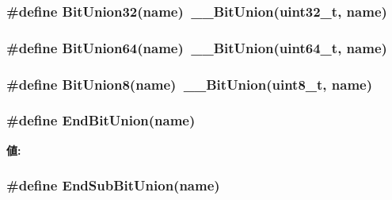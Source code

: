 \label{bitunion_8hh_ab20ad0bcf530a8c69acba93573493580}
\hypertarget{bitunion_8hh_a0ccde5c4cc801eb6422a3b9a11d4815f}{
\subsubsection[{BitUnion32}]{\setlength{\rightskip}{0pt plus 5cm}\#define BitUnion32(name)~\_\-\_\-BitUnion({\bf uint32\_\-t}, name)}}
\label{bitunion_8hh_a0ccde5c4cc801eb6422a3b9a11d4815f}
\hypertarget{bitunion_8hh_a0f253eb4eb77a755d985e07b3dee8a03}{
\subsubsection[{BitUnion64}]{\setlength{\rightskip}{0pt plus 5cm}\#define BitUnion64(name)~\_\-\_\-BitUnion(uint64\_\-t, name)}}
\label{bitunion_8hh_a0f253eb4eb77a755d985e07b3dee8a03}
\hypertarget{bitunion_8hh_a64e8480fc40a8490a0db7a656e9c3b30}{
\subsubsection[{BitUnion8}]{\setlength{\rightskip}{0pt plus 5cm}\#define BitUnion8(name)~\_\-\_\-BitUnion(uint8\_\-t, name)}}
\label{bitunion_8hh_a64e8480fc40a8490a0db7a656e9c3b30}
\hypertarget{bitunion_8hh_a2b65fb4c081b1e4853eac07e606060e5}{
\subsubsection[{EndBitUnion}]{\setlength{\rightskip}{0pt plus 5cm}\#define EndBitUnion(name)}}
\label{bitunion_8hh_a2b65fb4c081b1e4853eac07e606060e5}
{\bfseries 値:}
\begin{DoxyCode}
}; \
    }; \
    typedef BitfieldBackend::BitUnionOperators< \
        BitfieldUnderlyingClasses##name::__DataType, \
        BitfieldUnderlyingClasses##name> name;
\end{DoxyCode}
\hypertarget{bitunion_8hh_ab640680c2b6f558138bf66947382f384}{
\subsubsection[{EndSubBitUnion}]{\setlength{\rightskip}{0pt plus 5cm}\#define EndSubBitUnion(name)}}
